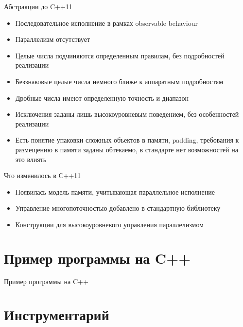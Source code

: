 \documentclass[unknownkeysallowed,xcolor=table]{beamer}
\makeatletter
\newcommand{\srcmediumsize}{\@setfontsize{\srcmediumsize}{7pt}{7pt}}
\makeatother
\begin{document}
\begin{frame}{Абстракции до C++11}
\begin{itemize}
  \item Последовательное исполнение в рамках observable behaviour
  \item Параллелизм отсутствует
  \item Целые числа подчиняются определенным правилам, без подробностей реализации
  \item Беззнаковые целые числа немного ближе к аппаратным подробностям
  \item Дробные числа имеют определенную точность и диапазон
  \item Исключения заданы лишь высокоуровневым поведением, без особенностей реализации
  \item Есть понятие упаковки сложных объектов в памяти, padding, требования к размещению в памяти заданы обтекаемо, в стандарте нет возможностей на это влиять
\end{itemize}
\end{frame}

\begin{frame}{Что изменилось в C++11}
\begin{itemize}
  \item Появилась модель памяти, учитывающая параллельное исполнение \vspace{3em}
  \item Управление многопоточностью добавлено в стандартную библиотеку \vspace{3em}
  \item Конструкции для высокоуровневого управления параллелизмом \vspace{3em}
\end{itemize}
\end{frame}

\section{Пример программы на C++}

\begin{frame}[fragile]{Пример программы на C++}

\end{frame}

\section{Инструментарий}
\end{document}

